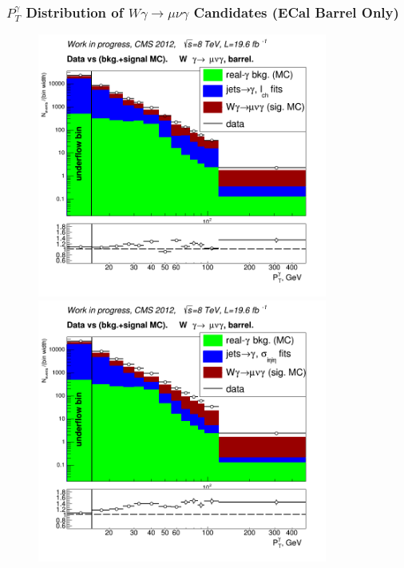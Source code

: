 \begin{frame}\frametitle{\footnotesize{$P_T^{\gamma}$ Distribution of $W\gamma\rightarrow\mu\nu\gamma$ Candidates (ECal Barrel Only)}}

\begin{minipage}[b]{0.49\textwidth}
   \begin{figure}[htb]
    \begin{center}
       \includegraphics[width=0.85\textwidth]{../figs/ForPresentation/forDefense_DATAvsBKGplusSIG_CHISO_Wg_Muon.png}\\
       \includegraphics[width=0.85\textwidth]{../figs/ForPresentation/forDefense_DATAvsBKGplusSIG_SIHIH_Wg_Muon.png}\\

\end{center}
\end{figure}
\end{minipage}
\end{frame}
